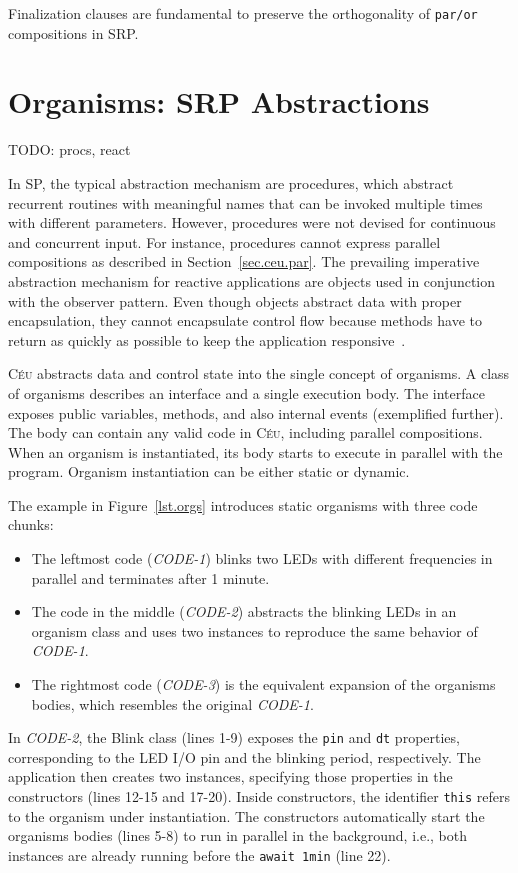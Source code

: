 \documentclass{acm_proc_article-sp}
\newcommand{\CEU}{\textsc{C\'{e}u}\xspace}
\newcommand{\code}[1] {{\small{\texttt{#1}}}}
\newcommand{\1}{\;}
\newcommand{\2}{\;\;}
\newcommand{\3}{\;\;\;}
\newcommand{\5}{\;\;\;\;\;}
\begin{document}
Finalization clauses are fundamental to preserve the orthogonality of 
\code{par/or} compositions in SRP.

\section{Organisms: SRP Abstractions}
\label{sec.orgs}

TODO: procs, react

%
In SP, the typical abstraction mechanism are procedures, which abstract
recurrent routines with meaningful names that can be invoked multiple times 
with different parameters.
%
However, procedures were not devised for continuous and concurrent input.
For instance, procedures cannot express parallel compositions as described in 
Section~\ref{sec.ceu.par}.
%
The prevailing imperative abstraction mechanism for reactive applications are 
objects used in conjunction with the observer pattern.
Even though objects abstract data with proper encapsulation, they cannot 
encapsulate control flow because methods have to return as quickly as possible 
to keep the application responsive~\cite{TODO.games.patterns}.

\CEU abstracts data and control state into the single concept of organisms.
%
A class of organisms describes an interface and a single execution body.
The interface exposes public variables, methods, and also internal events 
(exemplified further).
The body can contain any valid code in \CEU, including parallel compositions.
When an organism is instantiated, its body starts to execute in parallel with 
the program.
Organism instantiation can be either static or dynamic.

The example in Figure~\ref{lst.orgs} introduces static organisms with three 
code chunks:
%
\begin{itemize}
\item The leftmost code (\emph{CODE-1}) blinks two LEDs with different 
frequencies in parallel and terminates after 1 minute.
%
\item The code in the middle (\emph{CODE-2}) abstracts the blinking LEDs in an 
organism class and uses two instances to reproduce the same behavior of 
\emph{CODE-1}.
%
\item The rightmost code (\emph{CODE-3}) is the equivalent expansion of the 
organisms bodies, which resembles the original \emph{CODE-1}.
\end{itemize}
%
In \emph{CODE-2}, the Blink class (lines 1-9) exposes the \code{pin} and 
\code{dt} properties, corresponding to the LED I/O pin and the blinking period, 
respectively.
The application then creates two instances, specifying those properties in the 
constructors (lines 12-15 and 17-20).
Inside constructors, the identifier \code{this} refers to the organism under 
instantiation.
The constructors automatically start the organisms bodies (lines 5-8) to run in 
parallel in the background, i.e., both instances are already running before the 
\code{await 1min} (line 22).
\end{document}
